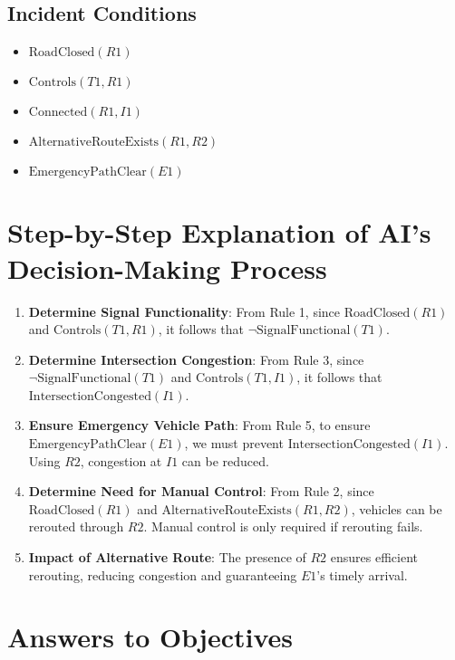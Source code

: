 \documentclass[12pt]{article}
\begin{document}
\subsection*{Incident Conditions}
\begin{itemize}
    \item $\text{RoadClosed}(R1)$
    \item $\text{Controls}(T1, R1)$
    \item $\text{Connected}(R1, I1)$
    \item $\text{AlternativeRouteExists}(R1, R2)$
    \item $\text{EmergencyPathClear}(E1)$
\end{itemize}

\section*{Step-by-Step Explanation of AI’s Decision-Making Process}

\begin{enumerate}
    \item \textbf{Determine Signal Functionality}: From Rule 1, since $\text{RoadClosed}(R1)$ and $\text{Controls}(T1, R1)$, it follows that $\neg \text{SignalFunctional}(T1)$.
    \item \textbf{Determine Intersection Congestion}: From Rule 3, since $\neg \text{SignalFunctional}(T1)$ and $\text{Controls}(T1, I1)$, it follows that $\text{IntersectionCongested}(I1)$.
    \item \textbf{Ensure Emergency Vehicle Path}: From Rule 5, to ensure $\text{EmergencyPathClear}(E1)$, we must prevent $\text{IntersectionCongested}(I1)$. Using $R2$, congestion at $I1$ can be reduced.
    \item \textbf{Determine Need for Manual Control}: From Rule 2, since $\text{RoadClosed}(R1)$ and $\text{AlternativeRouteExists}(R1, R2)$, vehicles can be rerouted through $R2$. Manual control is only required if rerouting fails.
    \item \textbf{Impact of Alternative Route}: The presence of $R2$ ensures efficient rerouting, reducing congestion and guaranteeing $E1$'s timely arrival.
\end{enumerate}

\section*{Answers to Objectives}
\end{document}
